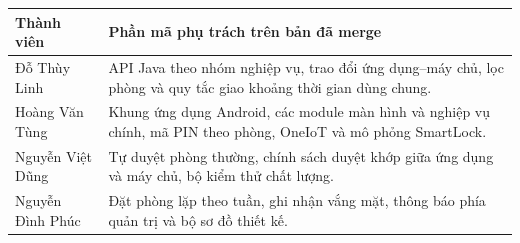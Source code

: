 \documentclass[../DoAn.tex]{subfiles}
\begin{document}
\vspace{0.3cm}

\begin{table}[H]
\centering
\small
\renewcommand{\arraystretch}{1.25}

\begin{tabularx}{\textwidth}{
    >{\raggedright\arraybackslash}p{3.6cm}
    >{\raggedright\arraybackslash}X
}
\toprule
\textbf{Thành viên} & \textbf{Phần mã phụ trách trên bản đã merge} \\
\midrule
Đỗ Thùy Linh &
API Java theo nhóm nghiệp vụ, trao đổi ứng dụng--máy chủ, lọc phòng và quy tắc giao khoảng thời gian dùng chung. \\
Hoàng Văn Tùng &
Khung ứng dụng Android, các module màn hình và nghiệp vụ chính, mã PIN theo phòng, OneIoT và mô phỏng SmartLock. \\
Nguyễn Việt Dũng &
Tự duyệt phòng thường, chính sách duyệt khớp giữa ứng dụng và máy chủ, bộ kiểm thử chất lượng. \\
Nguyễn Đình Phúc &
Đặt phòng lặp theo tuần, ghi nhận vắng mặt, thông báo phía quản trị và bộ sơ đồ thiết kế. \\
\bottomrule
\end{tabularx}
\end{table}
\end{document}

